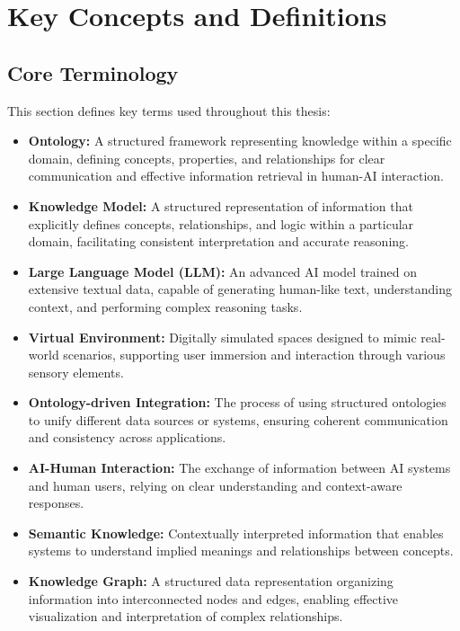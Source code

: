 \section{Key Concepts and Definitions}

\subsection{Core Terminology}
This section defines key terms used throughout this thesis:

\begin{itemize}
    \item \textbf{Ontology:} A structured framework representing knowledge within a specific domain, defining concepts, properties, and relationships for clear communication and effective information retrieval in human-AI interaction.
    
    \item \textbf{Knowledge Model:} A structured representation of information that explicitly defines concepts, relationships, and logic within a particular domain, facilitating consistent interpretation and accurate reasoning.
    
    \item \textbf{Large Language Model (LLM):} An advanced AI model trained on extensive textual data, capable of generating human-like text, understanding context, and performing complex reasoning tasks.
    
    \item \textbf{Virtual Environment:} Digitally simulated spaces designed to mimic real-world scenarios, supporting user immersion and interaction through various sensory elements.
     
    \item \textbf{Ontology-driven Integration:} The process of using structured ontologies to unify different data sources or systems, ensuring coherent communication and consistency across applications.
    
    \item \textbf{AI-Human Interaction:} The exchange of information between AI systems and human users, relying on clear understanding and context-aware responses.
    
    \item \textbf{Semantic Knowledge:} Contextually interpreted information that enables systems to understand implied meanings and relationships between concepts.
    
    \item \textbf{Knowledge Graph:} A structured data representation organizing information into interconnected nodes and edges, enabling effective visualization and interpretation of complex relationships.
\end{itemize}
